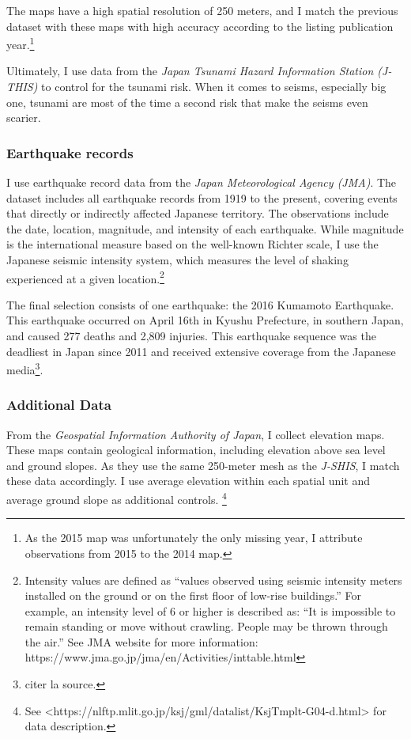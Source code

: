 \documentclass[
  letterpaper,
  DIV=11,
  numbers=noendperiod]{scrartcl}
\begin{document}
The maps have a high spatial resolution of 250 meters, and I match the
previous dataset with these maps with high accuracy according to the
listing publication
year.\footnote{As the 2015 map was unfortunately the only missing year, I attribute observations from 2015 to the 2014 map.}

Ultimately, I use data from the
\textit{Japan Tsunami Hazard Information Station (J-THIS)} to control
for the tsunami risk. When it comes to seisms, especially big one,
tsunami are most of the time a second risk that make the seisms even
scarier.

\subsubsection{Earthquake records}

I use earthquake record data from the
\textit{Japan Meteorological Agency (JMA)}. The dataset includes all
earthquake records from 1919 to the present, covering events that
directly or indirectly affected Japanese territory. The observations
include the date, location, magnitude, and intensity of each earthquake.
While magnitude is the international measure based on the well-known
Richter scale, I use the Japanese seismic intensity system, which
measures the level of shaking experienced at a given
location.\footnote{Intensity values are defined as “values observed using seismic intensity meters installed on the ground or on the first floor of low-rise buildings.” For example, an intensity level of 6 or higher is described as: “It is impossible to remain standing or move without crawling. People may be thrown through the air.” See JMA website for more information: https://www.jma.go.jp/jma/en/Activities/inttable.html}

The final selection consists of one earthquake: the 2016 Kumamoto
Earthquake. This earthquake occurred on April 16th in Kyushu Prefecture,
in southern Japan, and caused 277 deaths and 2,809 injuries. This
earthquake sequence was the deadliest in Japan since 2011 and received
extensive coverage from the Japanese media\footnote{citer la source.}.

\subsubsection{Additional Data}

From the \textit{Geospatial Information Authority of Japan}, I collect
elevation maps. These maps contain geological information, including
elevation above sea level and ground slopes. As they use the same
250-meter mesh as the \textit{J-SHIS}, I match these data accordingly. I
use average elevation within each spatial unit and average ground slope
as additional controls.
\footnote{See <https://nlftp.mlit.go.jp/ksj/gml/datalist/KsjTmplt-G04-d.html> for data description.}
\end{document}
